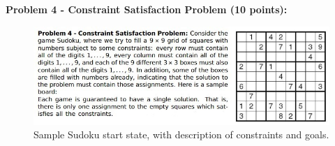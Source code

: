 \documentclass[12pt]{article}
\begin{document}
\textbf{Problem 4 - Constraint Satisfaction Problem (10 points):}

\begin{figure}[h]
    \centering
    \includegraphics[width=\textwidth]{homework1/images/probdescrips/prob4.jpg}
	\caption{Sample Sudoku start state, with description of constraints and goals.}
	\label{fig:prob4}
\end{figure}
\end{document}
